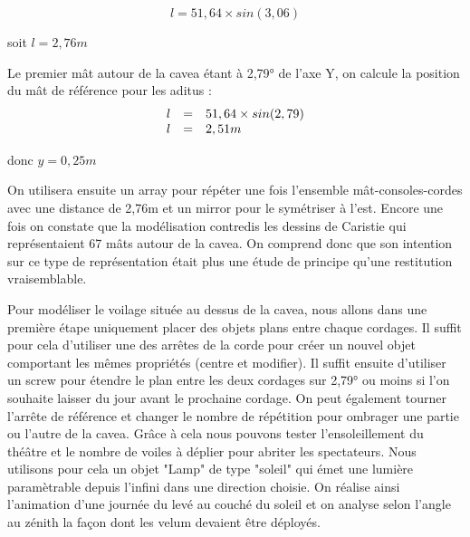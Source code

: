 \begin{equation}
	l =  51,64 \times sin(3,06) 
\end{equation}
\begin{center}
	soit $l = 2,76m$
\end{center}

Le premier mât autour de la cavea étant à 2,79° de l'axe Y, on calcule la position du mât de référence pour les aditus :
\begin{equation}
	\begin{array}{r c l}
		l & = & 51,64 \times sin(2,79) \\
		l &= & 2,51m
	\end{array}
\end{equation}
\begin{center}
	donc $y = 0,25m$
\end{center}

On utilisera ensuite un \gls{array} pour répéter une fois l'ensemble mât-consoles-cordes avec une distance de 2,76m et un \gls{mirror} pour le symétriser à l'est. Encore une fois on constate que la modélisation contredis les dessins de Caristie qui représentaient 67 mâts autour de la cavea. On comprend donc que son intention sur ce type de représentation était plus une étude de principe qu'une restitution vraisemblable.

Pour modéliser le voilage située au dessus de la cavea, nous allons dans une première étape uniquement placer des objets plans entre chaque cordages. Il suffit pour cela d'utiliser une des arrêtes de la corde pour créer un nouvel objet comportant les mêmes propriétés (centre et modifier). Il suffit ensuite d'utiliser un \gls{screw} pour étendre le plan entre les deux cordages sur 2,79° ou moins si l'on souhaite laisser du jour avant le prochaine cordage. On peut également tourner l'arrête de référence et changer le nombre de répétition pour ombrager une partie ou l'autre de la cavea. Grâce à cela nous pouvons tester l'ensoleillement du théâtre et le nombre de voiles à déplier pour abriter les spectateurs. Nous utilisons pour cela un objet "Lamp" de type "soleil" qui émet une lumière paramètrable depuis l'infini dans une direction choisie. On réalise ainsi l'animation d'une journée du levé au couché du soleil et on analyse selon l'angle au zénith la façon dont les velum devaient être déployés. 


